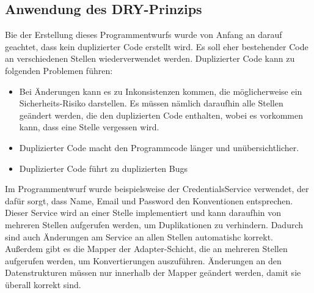 \subsection{Anwendung des DRY-Prinzips}
Bie der Erstellung dieses Programmentwurfs wurde von Anfang an darauf geachtet, dass kein duplizierter Code erstellt wird. Es soll eher bestehender Code an verschiedenen Stellen wiederverwendet werden. Duplizierter Code kann zu folgenden Problemen führen:
\begin{itemize}
    \item Bei Änderungen kann es zu Inkonsistenzen kommen, die möglicherweise ein Sicherheits-Risiko darstellen. Es müssen nämlich daraufhin alle Stellen geändert werden, die den duplizierten Code enthalten, wobei es vorkommen kann, dass eine Stelle vergessen wird.
    \item Duplizierter Code macht den Programmcode länger und unübersichtlicher.
    \item Duplizierter Code führt zu duplizierten Bugs
\end{itemize}
Im Programmentwurf wurde beispielsweise der \glqq CredentialsService \grqq verwendet, der dafür sorgt, dass Name, Email und Password den Konventionen entsprechen. Dieser Service wird an einer Stelle implementiert und kann daraufhin von mehreren Stellen aufgerufen werden, 
um Duplikationen zu verhindern. Dadurch sind auch Änderungen am Service an allen Stellen automatishc korrekt. Außerdem gibt es die Mapper der Adapter-Schicht, die an mehreren Stellen aufgerufen werden, um Konvertierungen auszuführen. Änderungen an den Datenstrukturen müssen nur innerhalb der 
Mapper geändert werden, damit sie überall korrekt sind.